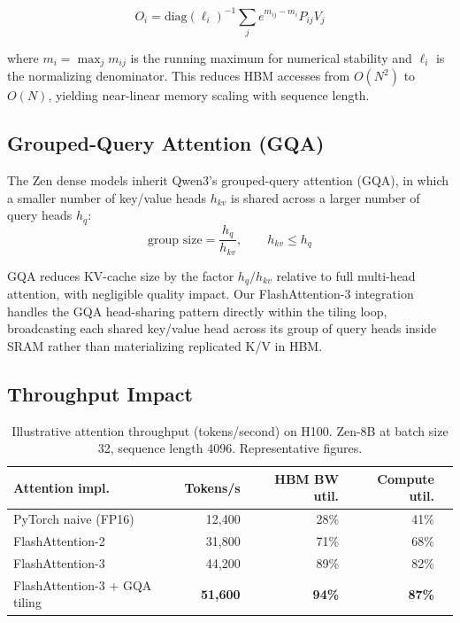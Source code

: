 \documentclass[11pt,a4paper]{article}
\begin{document}
\begin{equation}
    O_i = \text{diag}(\ell_i)^{-1} \sum_j e^{m_{ij} - m_i} P_{ij} V_j
    \label{eq:fa3_output}
\end{equation}

where $m_i = \max_j m_{ij}$ is the running maximum for numerical stability and $\ell_i$
is the normalizing denominator. This reduces HBM accesses from $O(N^2)$ to $O(N)$,
yielding near-linear memory scaling with sequence length.

\subsection{Grouped-Query Attention (GQA)}

The Zen dense models inherit Qwen3's grouped-query attention (GQA), in which a smaller
number of key/value heads $h_{kv}$ is shared across a larger number of query heads $h_q$:
\begin{equation}
    \text{group size} = \frac{h_q}{h_{kv}}, \qquad h_{kv} \le h_q
    \label{eq:gqa}
\end{equation}

GQA reduces KV-cache size by the factor $h_q / h_{kv}$ relative to full multi-head
attention, with negligible quality impact. Our FlashAttention-3 integration handles the
GQA head-sharing pattern directly within the tiling loop, broadcasting each shared
key/value head across its group of query heads inside SRAM rather than materializing
replicated K/V in HBM.

\subsection{Throughput Impact}

\begin{table}[H]
\centering
\caption{Illustrative attention throughput (tokens/second) on H100. Zen-8B at batch size 32,
sequence length 4096. Representative figures.}
\begin{tabular}{lrrrr}
\toprule
\textbf{Attention impl.} & \textbf{Tokens/s} & \textbf{HBM BW util.} & \textbf{Compute util.} \\
\midrule
PyTorch naive (FP16)          & 12,400 & 28\% & 41\% \\
FlashAttention-2              & 31,800 & 71\% & 68\% \\
FlashAttention-3              & 44,200 & 89\% & 82\% \\
FlashAttention-3 + GQA tiling & \textbf{51,600} & \textbf{94\%} & \textbf{87\%} \\
\bottomrule
\end{tabular}
\label{tab:fa_throughput}
\end{table}
\end{document}
